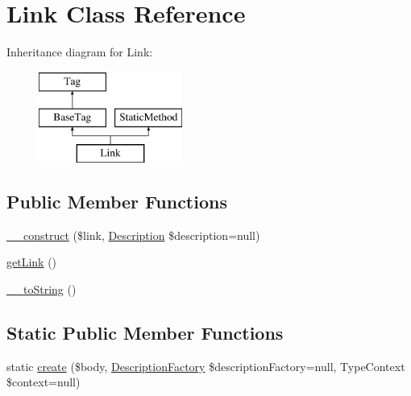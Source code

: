 \hypertarget{classphp_documentor_1_1_reflection_1_1_doc_block_1_1_tags_1_1_link}{}\section{Link Class Reference}
\label{classphp_documentor_1_1_reflection_1_1_doc_block_1_1_tags_1_1_link}
Inheritance diagram for Link\+:\begin{figure}[H]
\begin{center}
\leavevmode
\includegraphics[height=3.000000cm]{classphp_documentor_1_1_reflection_1_1_doc_block_1_1_tags_1_1_link}
\end{center}
\end{figure}
\subsection*{Public Member Functions}
\begin{DoxyCompactItemize}
\item 
\mbox{\hyperlink{classphp_documentor_1_1_reflection_1_1_doc_block_1_1_tags_1_1_link_ad55e1793e9ee2976c202c94aef5e291e}{\+\_\+\+\_\+construct}} (\$link, \mbox{\hyperlink{classphp_documentor_1_1_reflection_1_1_doc_block_1_1_description}{Description}} \$description=null)
\item 
\mbox{\hyperlink{classphp_documentor_1_1_reflection_1_1_doc_block_1_1_tags_1_1_link_abea978f4dcd47c4289232744d3ed2f01}{get\+Link}} ()
\item 
\mbox{\hyperlink{classphp_documentor_1_1_reflection_1_1_doc_block_1_1_tags_1_1_link_a7516ca30af0db3cdbf9a7739b48ce91d}{\+\_\+\+\_\+to\+String}} ()
\end{DoxyCompactItemize}
\subsection*{Static Public Member Functions}
\begin{DoxyCompactItemize}
\item 
static \mbox{\hyperlink{classphp_documentor_1_1_reflection_1_1_doc_block_1_1_tags_1_1_link_a11e724d29317978c2b5add32da21a158}{create}} (\$body, \mbox{\hyperlink{classphp_documentor_1_1_reflection_1_1_doc_block_1_1_description_factory}{Description\+Factory}} \$description\+Factory=null, Type\+Context \$context=null)
\end{DoxyCompactItemize}
